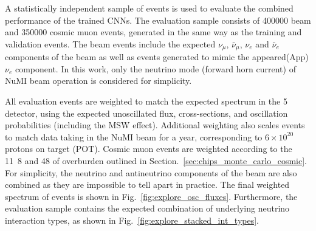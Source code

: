 A statistically independent sample of events is used to evaluate the combined performance of the
trained CNNs. The evaluation sample consists of 400000 beam and 350000 cosmic muon events,
generated in the same way as the training and validation events. The beam events include the
expected $\nu_{\mu}$, $\bar{\nu}_{\mu}$, $\nu_{e}$ and $\bar{\nu}_{e}$ components of the beam as
well as events generated to mimic the appeared(App) $\nu_{e}$ component. In this work, only the
neutrino mode (forward horn current) of NuMI beam operation is considered for simplicity.

All evaluation events are weighted to match the expected spectrum in the \unit{5}{}
\chipsfive detector, using the expected unoscillated flux, cross-sections, and oscillation
probabilities (including the MSW effect). Additional weighting also scales events to match data
taking in the NuMI beam for a year, corresponding to $6\times 10^{20}$ protons on target (POT).
Cosmic muon events are weighted according to the \unit{11.8}{} and
\unit{48}{} of overburden outlined in Section.~\ref{sec:chips_monte_carlo_cosmic}. For
simplicity, the neutrino and antineutrino components of the beam are also combined as they are
impossible to tell apart in practice. The final weighted spectrum of events is shown in
Fig.~\ref{fig:explore_osc_fluxes}. Furthermore, the evaluation sample contains the expected
combination of underlying neutrino interaction types, as shown in
Fig.~\ref{fig:explore_stacked_int_types}.

